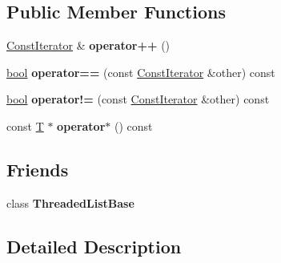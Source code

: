 \subsection*{Public Member Functions}
\begin{DoxyCompactItemize}
\item 
\mbox{\label{classv8_1_1base_1_1ThreadedListBase_1_1ConstIterator_a90a036de1f9584dbab5be8c83e1736e2}} 
\mbox{\hyperlink{classv8_1_1base_1_1ThreadedListBase_1_1ConstIterator}{Const\+Iterator}} \& {\bfseries operator++} ()
\item 
\mbox{\label{classv8_1_1base_1_1ThreadedListBase_1_1ConstIterator_a524007c590c83b2636a3ae4c5076bfa5}} 
\mbox{\hyperlink{classbool}{bool}} {\bfseries operator==} (const \mbox{\hyperlink{classv8_1_1base_1_1ThreadedListBase_1_1ConstIterator}{Const\+Iterator}} \&other) const
\item 
\mbox{\label{classv8_1_1base_1_1ThreadedListBase_1_1ConstIterator_a8307184c826cb0957ee3ff1f84c7509a}} 
\mbox{\hyperlink{classbool}{bool}} {\bfseries operator!=} (const \mbox{\hyperlink{classv8_1_1base_1_1ThreadedListBase_1_1ConstIterator}{Const\+Iterator}} \&other) const
\item 
\mbox{\label{classv8_1_1base_1_1ThreadedListBase_1_1ConstIterator_a177f8d8003a8851158c2fef601867203}} 
const \mbox{\hyperlink{classv8_1_1internal_1_1torque_1_1T}{T}} $\ast$ {\bfseries operator$\ast$} () const
\end{DoxyCompactItemize}
\subsection*{Friends}
\begin{DoxyCompactItemize}
\item 
\mbox{\label{classv8_1_1base_1_1ThreadedListBase_1_1ConstIterator_a212195f95aeeefa4942d777bce073178}} 
class {\bfseries Threaded\+List\+Base}
\end{DoxyCompactItemize}


\subsection{Detailed Description}
